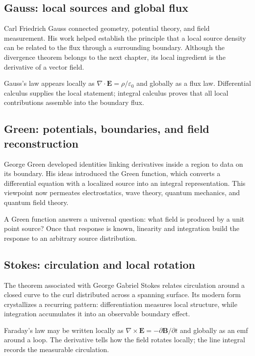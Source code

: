 \subsection{Gauss: local sources and global flux}
\begin{historicalnote}
Carl Friedrich Gauss connected geometry, potential theory, and field
measurement.  His work helped establish the principle that a local source
density can be related to the flux through a surrounding boundary.  Although
the divergence theorem belongs to the next chapter, its local ingredient is
the derivative of a vector field.
\end{historicalnote}
\begin{bookinsight}
Gauss's law appears locally as $\nabla\!\cdot\mathbf E=\rho/\varepsilon_0$ and
globally as a flux law.  Differential calculus supplies the local statement;
integral calculus proves that all local contributions assemble into the
boundary flux.
\end{bookinsight}

\subsection{Green: potentials, boundaries, and field reconstruction}
\begin{historicalnote}
George Green developed identities linking derivatives inside a region to data
on its boundary.  His ideas introduced the Green function, which converts a
differential equation with a localized source into an integral representation.
This viewpoint now permeates electrostatics, wave theory, quantum mechanics,
and quantum field theory.
\end{historicalnote}
\begin{bookinsight}
A Green function answers a universal question: what field is produced by a
unit point source?  Once that response is known, linearity and integration
build the response to an arbitrary source distribution.
\end{bookinsight}

\subsection{Stokes: circulation and local rotation}
\begin{historicalnote}
The theorem associated with George Gabriel Stokes relates circulation around
a closed curve to the curl distributed across a spanning surface.  Its modern
form crystallizes a recurring pattern: differentiation measures local
structure, while integration accumulates it into an observable boundary
effect.
\end{historicalnote}
\begin{bookinsight}
Faraday's law may be written locally as
$\nabla\!\times\mathbf E=-\partial\mathbf B/\partial t$ and globally as an
emf around a loop.  The derivative tells how the field rotates locally; the
line integral records the measurable circulation.
\end{bookinsight}

